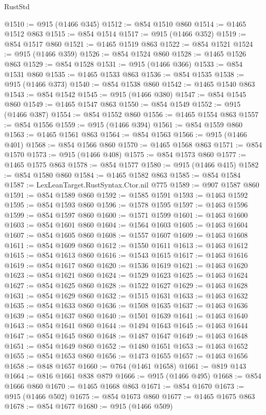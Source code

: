 \begin{lexlean}{RustStd}
\begin{coremodule}
@1510 := @915 (@1466 @345)
@1512 := @854 @1510 @860
@1514 := @1465 @1512 @863
@1515 := @854 @1514
@1517 := @915 (@1466 @352)
@1519 := @854 @1517 @860
@1521 := @1465 @1519 @863
@1522 := @854 @1521
@1524 := @915 (@1466 @359)
@1526 := @854 @1524 @860
@1528 := @1465 @1526 @863
@1529 := @854 @1528
@1531 := @915 (@1466 @366)
@1533 := @854 @1531 @860
@1535 := @1465 @1533 @863
@1536 := @854 @1535
@1538 := @915 (@1466 @373)
@1540 := @854 @1538 @860
@1542 := @1465 @1540 @863
@1543 := @854 @1542
@1545 := @915 (@1466 @380)
@1547 := @854 @1545 @860
@1549 := @1465 @1547 @863
@1550 := @854 @1549
@1552 := @915 (@1466 @387)
@1554 := @854 @1552 @860
@1556 := @1465 @1554 @863
@1557 := @854 @1556
@1559 := @915 (@1466 @394)
@1561 := @854 @1559 @860
@1563 := @1465 @1561 @863
@1564 := @854 @1563
@1566 := @915 (@1466 @401)
@1568 := @854 @1566 @860
@1570 := @1465 @1568 @863
@1571 := @854 @1570
@1573 := @915 (@1466 @408)
@1575 := @854 @1573 @860
@1577 := @1465 @1575 @863
@1578 := @854 @1577
@1580 := @915 (@1466 @415)
@1582 := @854 @1580 @860
@1584 := @1465 @1582 @863
@1585 := @854 @1584
@1587 := LexLeanTarget.RustSyntax.Ctor.nil @775
@1589 := @907 @1587 @860
@1591 := @854 @1589 @860
@1592 := @1585 @1591
@1593 := @1463 @1592
@1595 := @854 @1593 @860
@1596 := @1578 @1595
@1597 := @1463 @1596
@1599 := @854 @1597 @860
@1600 := @1571 @1599
@1601 := @1463 @1600
@1603 := @854 @1601 @860
@1604 := @1564 @1603
@1605 := @1463 @1604
@1607 := @854 @1605 @860
@1608 := @1557 @1607
@1609 := @1463 @1608
@1611 := @854 @1609 @860
@1612 := @1550 @1611
@1613 := @1463 @1612
@1615 := @854 @1613 @860
@1616 := @1543 @1615
@1617 := @1463 @1616
@1619 := @854 @1617 @860
@1620 := @1536 @1619
@1621 := @1463 @1620
@1623 := @854 @1621 @860
@1624 := @1529 @1623
@1625 := @1463 @1624
@1627 := @854 @1625 @860
@1628 := @1522 @1627
@1629 := @1463 @1628
@1631 := @854 @1629 @860
@1632 := @1515 @1631
@1633 := @1463 @1632
@1635 := @854 @1633 @860
@1636 := @1508 @1635
@1637 := @1463 @1636
@1639 := @854 @1637 @860
@1640 := @1501 @1639
@1641 := @1463 @1640
@1643 := @854 @1641 @860
@1644 := @1494 @1643
@1645 := @1463 @1644
@1647 := @854 @1645 @860
@1648 := @1487 @1647
@1649 := @1463 @1648
@1651 := @854 @1649 @860
@1652 := @1480 @1651
@1653 := @1463 @1652
@1655 := @854 @1653 @860
@1656 := @1473 @1655
@1657 := @1463 @1656
@1658 := @848 @1657
@1660 := @764 (@1461 @1658)
@1661 := @819 @143
@1664 := @816 @1661 @838 @879
@1666 := @915 (@1466 @495)
@1668 := @854 @1666 @860
@1670 := @1465 @1668 @863
@1671 := @854 @1670
@1673 := @915 (@1466 @502)
@1675 := @854 @1673 @860
@1677 := @1465 @1675 @863
@1678 := @854 @1677
@1680 := @915 (@1466 @509)

\end{coremodule}
\end{lexlean}

